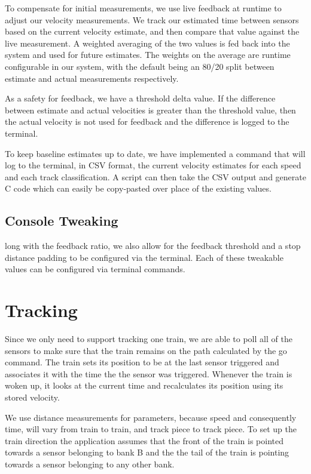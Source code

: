 \documentclass[pdftex,10pt,a4paper]{article}
\begin{document}
To compensate for initial measurements, we use live feedback at runtime
to adjust our velocity measurements. We track our estimated time
between sensors based on the current velocity estimate, and then
compare that value against the live measurement. A weighted averaging of
the two values is fed back into the system and used for future estimates.
The weights on the average are runtime configurable in our system, with
the default being an 80/20 split between estimate and actual measurements
respectively.

As a safety for feedback, we have a threshold delta value. If the
difference between estimate and actual velocities is greater than the
threshold value, then the actual velocity is not used for feedback and
the difference is logged to the terminal.

To keep baseline estimates up to date, we have implemented a 
command that will log to the terminal, in CSV format, the current
velocity estimates for each speed and each track classification. A script
can then take the CSV output and generate C code which can easily be
copy-pasted over place of the existing values.

\subsection*{Console Tweaking}

long with the feedback ratio, we also allow for the feedback threshold
and a stop distance padding to be configured via the terminal. Each of
these tweakable values can be configured via terminal commands.

\section*{Tracking}

Since we only need to support tracking one train, we are able to poll
all of the sensors to make sure that the train remains on the path
calculated by the go command. The train sets its position to be at the
last sensor triggered and associates it with the time the the sensor was
triggered. Whenever the train is woken up, it looks at the
current time and recalculates its position using its stored velocity.

We use distance measurements for parameters, because speed and
consequently time, will vary from train to train, and track piece to
track piece. To set up the train direction the application assumes that
the front of the train is pointed towards a sensor belonging to bank B
and the the tail of the train is pointing towards a sensor belonging to
any other bank.
\end{document}

